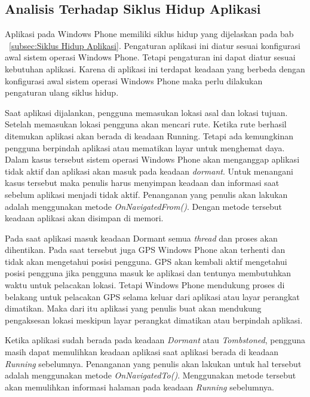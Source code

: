 \newpage
\subsection{Analisis Terhadap Siklus Hidup Aplikasi}
\label{lab:Analisis Terhadap Siklus Hidup Aplikasi}
\hspace{0.5cm} Aplikasi pada Windows Phone memiliki siklus hidup yang dijelaskan pada bab ~\ref{subsec:Siklus Hidup Aplikasi}. Pengaturan aplikasi ini diatur sesuai konfigurasi awal sistem operasi Windows Phone. Tetapi pengaturan ini dapat diatur sesuai kebutuhan aplikasi. Karena di aplikasi ini terdapat keadaan yang berbeda dengan konfigurasi awal sistem operasi Windows Phone maka perlu dilakukan pengaturan ulang siklus hidup.

\hspace{0.5cm} Saat aplikasi dijalankan, pengguna memasukan lokasi asal dan lokasi tujuan. Setelah memasukan lokasi pengguna akan mencari rute. Ketika rute berhasil ditemukan aplikasi akan berada di keadaan Running. Tetapi ada kemungkinan pengguna berpindah aplikasi atau mematikan layar untuk menghemat daya. Dalam kasus tersebut sistem operasi Windows Phone akan menganggap aplikasi tidak aktif dan aplikasi akan masuk pada keadaan \textit{dormant}. Untuk menangani kasus tersebut maka penulis harus menyimpan keadaan dan informasi saat sebelum aplikasi menjadi tidak aktif. Penanganan yang penulis akan lakukan adalah menggunakan metode \textit{OnNavigatedFrom()}. Dengan metode tersebut keadaan aplikasi akan disimpan di memori.

\hspace{0.5cm} Pada saat aplikasi masuk keadaan Dormant semua \textit{thread} dan proses akan dihentikan. Pada saat tersebut juga GPS Windows Phone akan terhenti dan tidak akan mengetahui posisi pengguna. GPS akan kembali aktif mengetahui posisi pengguna jika pengguna masuk ke aplikasi dan tentunya membutuhkan waktu untuk pelacakan lokasi. Tetapi Windows Phone mendukung proses di belakang untuk pelacakan GPS selama keluar dari aplikasi atau layar perangkat dimatikan. Maka dari itu aplikasi yang penulis buat akan mendukung pengaksesan lokasi meskipun layar perangkat dimatikan atau berpindah aplikasi. 

\hspace{0.5cm} Ketika aplikasi sudah berada pada keadaan \textit{Dormant} atau \textit{Tombstoned}, pengguna masih dapat memulihkan keadaan aplikasi saat aplikasi berada di keadaan \textit{Running} sebelumnya. Penanganan yang penulis akan lakukan untuk hal tersebut adalah menggunakan metode \textit{OnNavigatedTo()}. Menggunakan metode tersebut akan memulihkan informasi halaman pada keadaan \textit{Running} sebelumnya.

